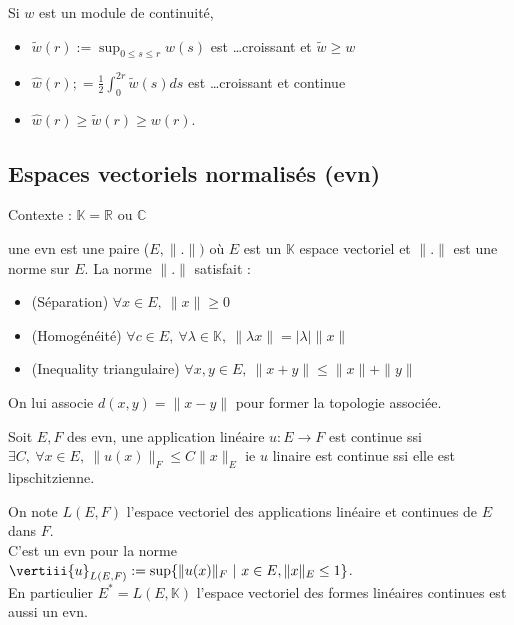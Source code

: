 \begin{remarque}
    Si $w$ est un module de continuité,
    \begin{itemize}
        \item $\tilde{w}(r):=\sup_{0\le s\le r} w(s)$ est \ldots croissant et $\tilde w\ge w$
        \item $\hat{w}(r);=\frac{1}{2} \int_0^{2r}\tilde{w}(s)ds$ est \ldots croissant et continue
        \item $\hat{w}(r)\ge \tilde{w}(r)\ge w(r)$.
    \end{itemize}
\end{remarque}

\subsection{Espaces vectoriels normalisés (evn)}
\noindent Contexte : $\mathbb{K}=\mathbb{R}$ ou $\mathbb{C}$
\begin{definition}
    une evn est une paire ($E,\|.\|)$ où $E$ est un $\mathbb{K}$ espace vectoriel et $\|.\|$ est une norme sur $E$. La norme $\|.\|$ satisfait :
    \begin{itemize}
        \item (Séparation) $\forall x\in E,\ \|x\|\ge 0$
        \item (Homogénéité) $\forall c\in E,\ \forall  \lambda\in \mathbb{K},\ \|\lambda x\|=|\lambda|\|x\|$
        \item (Inequality triangulaire) $\forall x,y \in E,\ \|x+y\|\le \|x\|+\|y\|$
    \end{itemize}
\end{definition}

On lui associe $d(x,y)=\|x-y\|$ pour former la topologie associée.

\begin{propriete}
    Soit $E,F$ des evn, une application linéaire $u:E\to F$ est continue ssi $\exists C,\ \forall x\in E,\ \|u(x)\|_F\le C\|x\|_E$ ie $u$ linaire est continue ssi elle est lipschitzienne.
\end{propriete}

On note $L(E,F)$ l'espace vectoriel des applications linéaire et continues de $E$ dans $F$.\\
C'est un evn pour la norme $\vertiii{u}_{L(E,F)}:=\sup\{\|u(x)\|_F\ |\ x\in E, \|x\|_E\le 1\} $. \\
En particulier $E^*=L(E,\mathbb{K})$ l'espace vectoriel des formes linéaires continues est aussi un evn.

